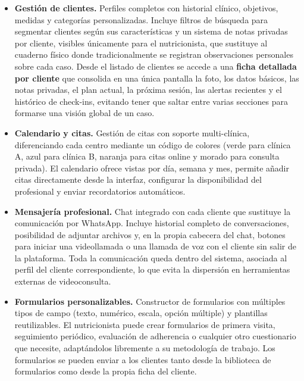 \begin{itemize}
    \item \textbf{Gestión de clientes.} Perfiles completos con historial clínico, objetivos, medidas y categorías personalizadas. Incluye filtros de búsqueda para segmentar clientes según sus características y un sistema de notas privadas por cliente, visibles únicamente para el nutricionista, que sustituye al cuaderno físico donde tradicionalmente se registran observaciones personales sobre cada caso. Desde el listado de clientes se accede a una \textbf{ficha detallada por cliente} que consolida en una única pantalla la foto, los datos básicos, las notas privadas, el plan actual, la próxima sesión, las alertas recientes y el histórico de check-ins, evitando tener que saltar entre varias secciones para formarse una visión global de un caso.

    \item \textbf{Calendario y citas.} Gestión de citas con soporte multi-clínica, diferenciando cada centro mediante un código de colores (verde para clínica A, azul para clínica B, naranja para citas online y morado para consulta privada). El calendario ofrece vistas por día, semana y mes, permite añadir citas directamente desde la interfaz, configurar la disponibilidad del profesional y enviar recordatorios automáticos.

    \item \textbf{Mensajería profesional.} Chat integrado con cada cliente que sustituye la comunicación por WhatsApp. Incluye historial completo de conversaciones, posibilidad de adjuntar archivos y, en la propia cabecera del chat, botones para iniciar una videollamada o una llamada de voz con el cliente sin salir de la plataforma. Toda la comunicación queda dentro del sistema, asociada al perfil del cliente correspondiente, lo que evita la dispersión en herramientas externas de videoconsulta.

    \item \textbf{Formularios personalizables.} Constructor de formularios con múltiples tipos de campo (texto, numérico, escala, opción múltiple) y plantillas reutilizables. El nutricionista puede crear formularios de primera visita, seguimiento periódico, evaluación de adherencia o cualquier otro cuestionario que necesite, adaptándolos libremente a su metodología de trabajo. Los formularios se pueden enviar a los clientes tanto desde la biblioteca de formularios como desde la propia ficha del cliente.


\end{itemize}
